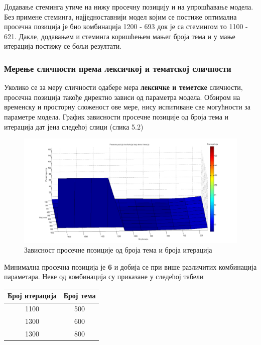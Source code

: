 Додавање стеминга утиче на нижу просечну позицију и на упрошћавање модела. Без примене стеминга, најједноставнији модел којим се постиже оптимална просечна позиција је био комбинација 1200 - 693 док је са стемингом то 1100 - 621. Дакле, додавањем и стеминга коришћењем мањег броја тема и у мање итерација постижу се бољи резултати. 


\subsubsection{Мерење сличности према лексичкој и тематској сличности}
	
Уколико се за меру сличности одабере мера  \textbf{лексичке и теметске} сличности, просечна позиција такође директно зависи од параметра модела. Обзиром на временску и просторну сложеност ове мере, нису испитиване све могућности за параметре модела. График зависности просечне позиције од броја тема и итерација дат јена следећој слици (слика 5.2)

		\begin{figure}[H]
    \centering
   \includegraphics[scale=0.3]{./Slike/distStemNoSyn.png} 
	\caption{Зависност просечне позиције од броја тема и броја итерација}
	\label{fig:slika1}
\end{figure}

Минимална просечна позиција је \textbf{6} и добија се при више различитих комбинација параметара. Неке од комбинација су приказане у следећој табели

\begin{center}
\begin{tabular}{|c|c|}
\hline
Број итерација & Број тема \\
\hline\hline
1100 & 500 \\
1300 & 600 \\
1300 & 800 \\
\hline
\end{tabular}

\end{center}



